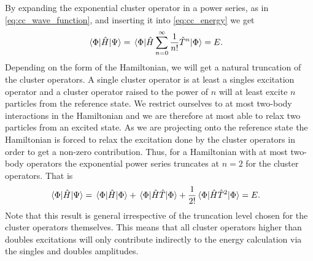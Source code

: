         By expanding the exponential cluster operator in a power series, as in
        \autoref{eq:cc_wave_function}, and inserting it into
        \autoref{eq:cc_energy} we get
        \begin{align}
            \mel*{\Phi}{\hat{H}}{\Psi}
            &=
            \mel*{\Phi}{
                \hat{H}
                \sum_{n = 0}^{\infty} \frac{1}{n!}\hat{T}^n
            }{\Phi}
            = E.
        \end{align}
        Depending on the form of the Hamiltonian, we will get a natural
        truncation of the cluster operators.
        A single cluster operator is at least a singles excitation operator and
        a cluster operator raised to the power of $n$ will at least excite $n$
        particles from the reference state.
        We restrict ourselves to at most two-body interactions in the
        Hamiltonian and we are therefore at most able to relax two particles
        from an excited state.
        As we are projecting onto the reference state the Hamiltonian is forced
        to relax the excitation done by the cluster operators in order to get a
        non-zero contribution.
        Thus, for a Hamiltonian with at most two-body operators the exponential
        power series truncates at $n = 2$ for the cluster operators.
        That is
        \begin{align}
            \mel*{\Phi}{\hat{H}}{\Psi}
            &=
            \mel*{\Phi}{\hat{H}}{\Phi}
            + \mel*{\Phi}{\hat{H} \hat{T}}{\Phi}
            + \frac{1}{2!}
            \mel*{\Phi}{\hat{H} \hat{T}^2}{\Phi}
            = E.
            \label{eq:cc-energy-initial}
        \end{align}
        Note that this result is general irrespective of the truncation level
        chosen for the cluster operators themselves.
        This means that all cluster operators higher than doubles excitations
        will only contribute indirectly to the energy calculation via the
        singles and doubles amplitudes.

